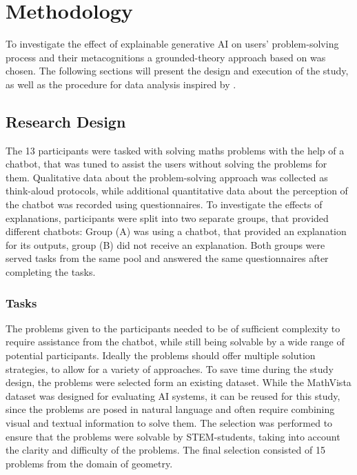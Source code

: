 \section{Methodology} \label{sec:methodology}

To investigate the effect of explainable generative \ac{AI} on users' problem-solving process and their metacognitions a grounded-theory approach based on \cite{Gioia2013} was chosen. The following sections will present the design and execution of the study, as well as the procedure for data analysis inspired by \cite{Jussupow2021}.

\subsection{Research Design} \label{ssec:research_design}

The 13 participants were tasked with solving maths problems with the help of a chatbot, that was tuned to assist the users without solving the problems for them. Qualitative data about the problem-solving approach was collected as think-aloud protocols, while additional quantitative data about the perception of the chatbot was recorded using questionnaires. To investigate the effects of explanations, participants were split into two separate groups, that provided different chatbots: Group (A) was using a chatbot, that provided an explanation for its outputs, group (B) did not receive an explanation. Both groups were served tasks from the same pool and answered the same questionnaires after completing the tasks.

\subsubsection{Tasks} \label{sssec:tasks}

The problems given to the participants needed to be of sufficient complexity to require assistance from the chatbot, while still being solvable by a wide range of potential participants. Ideally the problems should offer multiple solution strategies, to allow for a variety of approaches. To save time during the study design, the problems were selected form an existing dataset. While the MathVista dataset \parencite{MathVista2024} was designed for evaluating \ac{AI} systems, it can be reused for this study, since the problems are posed in natural language and often require combining visual and textual information to solve them. The selection was performed to ensure that the problems were solvable by \acs{STEM}-students, taking into account the clarity and difficulty of the problems. The final selection consisted of 15 problems from the domain of geometry.

